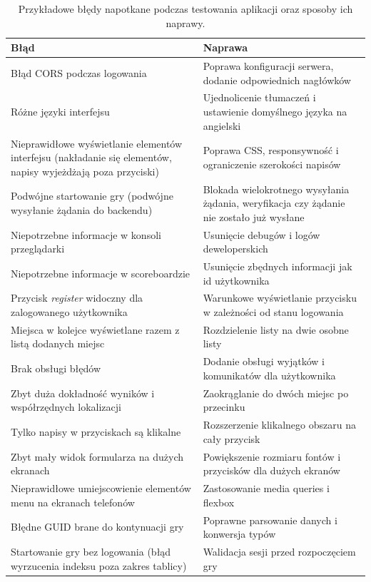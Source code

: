 \begin{table}[h!]
\caption{Przykładowe błędy napotkane podczas testowania aplikacji oraz sposoby ich naprawy.}
\centering
\begin{tabular}{|p{7cm}|p{7cm}|}
\hline
\textbf{Błąd} & \textbf{Naprawa} \\ \hline
Błąd CORS podczas logowania  & Poprawa konfiguracji serwera, dodanie odpowiednich nagłówków \\ \hline
Różne języki interfejsu & Ujednolicenie tłumaczeń i ustawienie domyślnego języka na angielski \\ \hline
Nieprawidłowe wyświetlanie elementów interfejsu (nakładanie się elementów, napisy wyjeżdżają poza przyciski) & Poprawa CSS, responsywność i ograniczenie szerokości napisów \\ \hline
Podwójne startowanie gry (podwójne wysyłanie żądania do backendu) & Blokada wielokrotnego wysyłania żądania, weryfikacja czy żądanie nie zostało już wysłane \\ \hline
Niepotrzebne informacje w konsoli przeglądarki & Usunięcie debugów i logów deweloperskich \\ \hline
Niepotrzebne informacje w scoreboardzie & Usunięcie zbędnych informacji jak id użytkownika \\ \hline
Przycisk \textit{register} widoczny dla zalogowanego użytkownika & Warunkowe wyświetlanie przycisku w zależności od stanu logowania \\ \hline
Miejsca w kolejce wyświetlane razem z listą dodanych miejsc & Rozdzielenie listy na dwie osobne listy \\ \hline
Brak obsługi błędów & Dodanie obsługi wyjątków i komunikatów dla użytkownika \\ \hline
Zbyt duża dokładność wyników i współrzędnych lokalizacji & Zaokrąglanie do dwóch miejsc po przecinku \\ \hline
Tylko napisy w przyciskach są klikalne & Rozszerzenie klikalnego obszaru na cały przycisk \\ \hline
Zbyt mały widok formularza na dużych ekranach & Powiększenie rozmiaru fontów i przycisków dla dużych ekranów \\ \hline
Nieprawidłowe umiejscowienie elementów menu na ekranach telefonów & Zastosowanie media queries i flexbox \\ \hline
Błędne GUID brane do kontynuacji gry & Poprawne parsowanie danych i konwersja typów \\ \hline
Startowanie gry bez logowania (błąd wyrzucenia indeksu poza zakres tablicy) & Walidacja sesji przed rozpoczęciem gry \\ \hline

\end{tabular}
\end{table}
